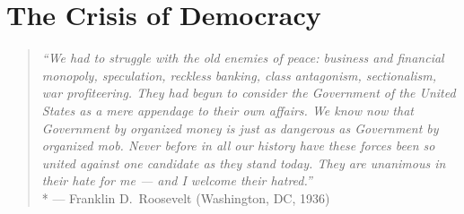 \section{The Crisis of Democracy}
\begin{quotation}
	\emph{``We had to struggle with the old enemies of peace:
	business and financial monopoly, speculation, reckless banking, class antagonism, sectionalism, war profiteering.
	They had begun to consider the Government of the United States as a mere appendage to their own affairs.
	We know now that Government by organized money is just as dangerous as Government by organized mob.
	Never before in all our history have these forces been so united against one candidate as they stand today.
	They are unanimous in their hate for me --- and I welcome their hatred.''}
	\\*
	--- Franklin D.\ Roosevelt (Washington, DC, 1936)
\end{quotation}





